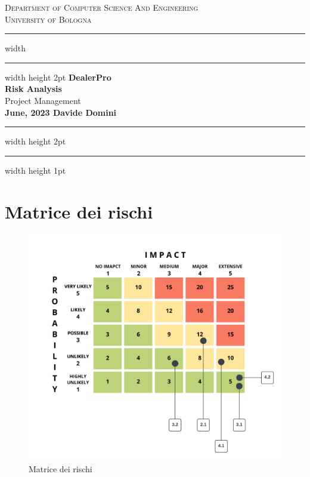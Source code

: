 \documentclass{article}
\begin{document}
\begin{titlepage}

  \newcommand{\HRule}{\rule{\linewidth}{0.5mm}}
  \center
  
  \textsc{\Large Department of Computer Science And Engineering}\\[0.5cm]
  
  \textsc{\Large University of Bologna}\\[0.6cm]
  
  \hrule width \hsize \kern 1mm \hrule width \hsize height 2pt 
  \vspace{0.8cm}
  { \large \bfseries DealerPro}\\[0.6cm]
  { \large \bfseries Risk Analysis}\\[0.6cm]
  { \large Project Management}\\[0.6cm]
  
  
  {\bfseries{June, 2023}
  \hfill
  \bfseries{Davide Domini}}\\[0.6cm]
  
  \hrule width \hsize height 2pt \kern 1mm \hrule width \hsize height 1pt
  \vspace{0.4cm}
  
  \end{titlepage}

  \clearpage
  
  \section{Matrice dei rischi}

  \begin{figure}[h!]
    \centering
    \includegraphics[width=\textwidth]{imgs/riskmatrix.png}
    \caption{Matrice dei rischi}
    \label{fig:risk_matrix}
  \end{figure}
\end{document}
